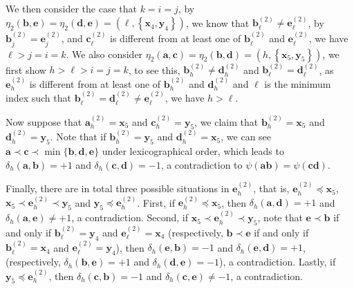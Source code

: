 \documentclass[11pt]{article}
\theoremstyle{definition}
\newcommand{\aaa}{\boldsymbol{a}}
\newcommand{\bb}{\boldsymbol{b}}
\newcommand{\cc}{\boldsymbol{c}}
\newcommand{\dd}{\boldsymbol{d}}
\newcommand{\ee}{\boldsymbol{e}}
\begin{document}
\begin{Case}
\begin{Case}
        We then consider the case that $k=i=j$, by $\eta_{2}(\bb,\ee)=\eta_{2}(\dd,\ee)=(\ell,\left\{\boldsymbol{x}_{4},\boldsymbol{y}_{4}\right\})$, we know that $\boldsymbol{b}_{\ell}^{(2)}\neq\ee_{\ell}^{(2)}$, by $\bb_{j}^{(2)}=\ee_{j}^{(2)}$, and $\cc_{\ell}^{(2)}$ is different from at least one of $\bb_{\ell}^{(2)}$ and $\ee_{\ell}^{(2)}$, we have $\ell> j=i=k$. We also consider $\eta_{2}(\aaa,\cc)=\eta_{2}(\bb,\dd)=(h,\left\{\boldsymbol{x}_{5},\boldsymbol{y}_{5}\right\})$, we first show $h>\ell>i=j=k$, to see this, $\bb_{h}^{(2)}\neq \dd_{h}^{(2)}$ and $\bb_{\ell}^{(2)}=\dd_{\ell}^{(2)}$, as $\ee_{h}^{(2)}$ is different from at least one of $\bb_{h}^{(2)}$ and $\dd_{h}^{(2)}$ and $\ell$ is the minimum index such that $\bb_{\ell}^{(2)}=\dd_{\ell}^{(2)}\neq\ee_{\ell}^{(2)}$, we have $h>\ell$.
        
       Now suppose that $\aaa_{h}^{(2)}=\boldsymbol{x}_{5}$ and $\cc_{h}^{(2)}=\boldsymbol{y}_{5}$, we claim that $\bb_{h}^{(2)}=\boldsymbol{x}_{5}$ and $\dd_{h}^{(2)}=\boldsymbol{y}_{5}$. Note that if $\bb_{h}^{(2)}=\boldsymbol{y}_{5}$ and $\dd_{h}^{(2)}=\boldsymbol{x}_{5}$, we can see $\aaa\prec\cc\prec\min\{\bb,\dd,\ee\}$ under lexicographical order, which leads to $\delta_{h}(\aaa,\bb)=+1$ and $\delta_{h}(\cc,\dd)=-1$, a contradiction to $\psi(\aaa\bb)=\psi(\cc\dd)$. 

       Finally, there are in total three possible situations in $\ee_{h}^{(2)}$, that is, $\ee_{h}^{(2)}\preceq\boldsymbol{x}_{5}$, $\boldsymbol{x}_{5}\prec\ee_{h}^{(2)}\prec \boldsymbol{y}_{5}$ and $\boldsymbol{y}_{5}\preceq \ee_{h}^{(2)}$. First, if $\ee_{h}^{(2)}\preceq\boldsymbol{x}_{5}$, then $\delta_{h}(\aaa,\dd)=+1$ and $\delta_{h}(\aaa,\ee)\neq +1$, a contradiction. Second, if $\boldsymbol{x}_{5}\prec\ee_{h}^{(2)}\prec \boldsymbol{y}_{5}$, note that $\ee\prec \boldsymbol{b}$ if and only if $\bb_{\ell}^{(2)}=\boldsymbol{y}_{4}$ and $\ee_{\ell}^{(2)}=\boldsymbol{x}_{4}$ (respectively, $\boldsymbol{b}\prec\ee$ if and only if $\bb_{\ell}^{(2)}=\boldsymbol{x}_{4}$ and $\ee_{\ell}^{(2)}=\boldsymbol{y}_{4}$), then $\delta_{h}(\ee,\bb)=-1$ and $\delta_{h}(\ee,\dd)=+1$, (respectively, $\delta_{h}(\bb,\ee)=+1$ and $\delta_{h}(\dd,\ee)=-1$), a contradiction. Lastly, if $\boldsymbol{y}_{5}\preceq \ee_{h}^{(2)}$, then $\delta_{h}(\cc,\bb)=-1$ and $\delta_{h}(\cc,\ee)\neq -1$, a contradiction. 
    \end{Case}


\end{Case}
\end{document}
